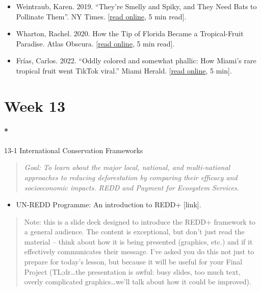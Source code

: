 \documentclass[
  10pt,
  letterpaper,
  oneside,
  open=any]{scrbook}
\let\oldparagraph\paragraph
\renewcommand{\paragraph}[1]{\oldparagraph{#1}\mbox{}}
\providecommand{\tightlist}{%
  \setlength{\itemsep}{0pt}\setlength{\parskip}{0pt}}\usepackage{longtable,booktabs,array}
\begin{document}
\begin{itemize}
\item
  Weintraub, Karen. 2019. ``They're Smelly and Spiky, and They Need Bats
  to Pollinate Them''. NY Times.
  {[}\href{https://www.nytimes.com/2019/12/04/science/bats-durians-indonesia.html}{read
  online}, 5 min read{]}.
\item
  Wharton, Rachel. 2020. How the Tip of Florida Became a Tropical-Fruit
  Paradise. Atlas Obscura.
  {[}\href{https://www.atlasobscura.com/articles/tropical-fruit-farms-in-united-states}{read
  online}, 5 min read{]}.
\item
  Frías, Carlos. 2022. ``Oddly colored and somewhat phallic: How Miami's
  rare tropical fruit went TikTok viral.'' Miami Herald.
  {[}\href{https://www.miamiherald.com/miami-com/restaurants/article263608093.html\#storylink=cpyhttps://www.miamiherald.com/miami-com/restaurants/article263608093.html}{read
  online}, 5 min{]}.
\end{itemize}

\section*{Week 13}\label{week-13}


\paragraph*{13-1 International Conservation
Frameworks}\label{international-conservation-frameworks}

\begin{quote}
\emph{Goal: To learn about the major local, national, and multi-national
approaches to reducing deforestation by comparing their efficacy and
socioeconomic impacts. REDD and Payment for Ecosystem Services.}
\end{quote}

\begin{itemize}
\tightlist
\item
  UN-REDD Programme: An introduction to REDD+ {[}link{]}.
\end{itemize}

\begin{quote}
Note: this is a slide deck designed to introduce the REDD+ framework to
a general audience. The content is exceptional, but don't just read the
material -- think about how it is being presented (graphics, etc.) and
if it effectively communicates their message. I've asked you do this not
just to prepare for today's lesson, but because it will be useful for
your Final Project (TL;dr\ldots the presentation is awful: busy slides,
too much text, overly complicated graphics\ldots we'll talk about how it
could be improved).
\end{quote}
\end{document}
